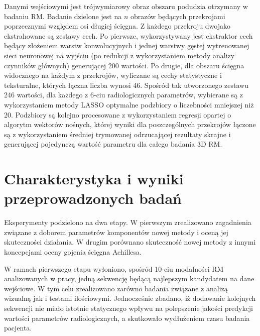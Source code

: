 Danymi wejściowymi jest trójwymiarowy obraz obszaru podudzia otrzymany \linebreak w badaniu RM. Badanie dzielone jest na $n$ obrazów będących przekrojami poprzecznymi względem osi długiej ścięgna. Z każdego przekroju dwojako ekstrahowane \linebreak są zestawy cech. Po pierwsze, wykorzystywany jest ekstraktor cech będący złożeniem warstw konwolucyjnych i jednej warstwy gęstej wytrenowanej sieci neuronowej na wyjściu (po redukcji z wykorzystaniem metody analizy czynników głównych) generującej 200 wartości. Po drugie, dla obszaru ścięgna widocznego na każdym z przekrojów, wyliczane są cechy statystyczne i teksturalne, których łączna liczba wynosi 46. Spośród tak utworzonego zestawu 246 wartości, dla każdego z 6-ciu radiologicznych parametrów, wybierane są z wykorzystaniem metody LASSO optymalne podzbiory o liczebności mniejszej niż 20. Podzbiory są kolejno procesowane z wykorzystaniem regresji opartej o algorytm wektorów nośnych, której wyniki dla poszczególnych przekrojów łączone są z wykorzystaniem średniej trymowanej odrzucającej rezultaty skrajne i generującej pojedynczą wartość parametru dla całego badania 3D RM.   


{\let\clearpage\relax\chapter*{Charakterystyka i wyniki przeprowadzonych badań}}

Eksperymenty podzielono na dwa etapy. W pierwszym zrealizowano zagadnienia związane z doborem parametrów komponentów nowej metody i oceną jej skuteczności działania. W drugim porównano skuteczność nowej metody z innymi koncepcjami oceny gojenia ścięgna Achillesa. 

W ramach pierwszego etapu wyłoniono, spośród 10-ciu modalności RM analizowanych w pracy, jedną sekwencję będącą najlepszym kandydatem na dane wejściowe. W tym celu zrealizowano zarówno badania związane z analizą wizualną jak i testami ilościowymi. Jednocześnie zbadano, iż dodawanie kolejnych sekwencji nie miało istotnie statycznego wpływu na polepszenie jakości predykcji wartości parametrów radiologicznych, a skutkowało wydłużeniem czasu badania pacjenta. 

